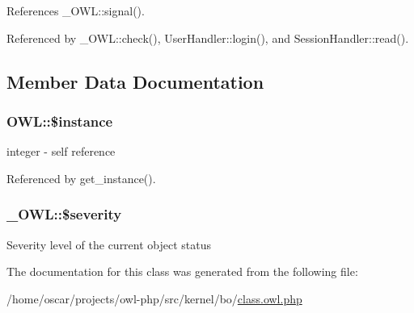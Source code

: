 References \_\-OWL::signal().



Referenced by \_\-OWL::check(), UserHandler::login(), and SessionHandler::read().



\subsection{Member Data Documentation}
\subsubsection[{\$instance}]{\setlength{\rightskip}{0pt plus 5cm}OWL::\$instance}\label{classOWL_a0cb39c7fa9a2bd2e7d5b8ef6d7e81fa4}
integer -\/ self reference 

Referenced by get\_\-instance().

\subsubsection[{\$severity}]{\setlength{\rightskip}{0pt plus 5cm}\_\-OWL::\$severity}\label{class__OWL_ad26b40a9dbbacb33e299b17826f8327c}
Severity level of the current object status 

The documentation for this class was generated from the following file:\begin{DoxyCompactItemize}
\item 
/home/oscar/projects/owl-\/php/src/kernel/bo/\hyperlink{class_8owl_8php}{class.owl.php}\end{DoxyCompactItemize}

